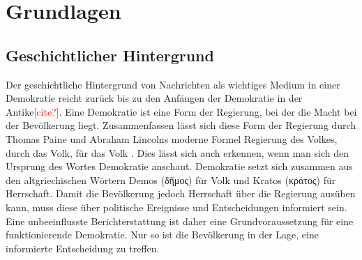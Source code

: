 \section{Grundlagen}

\subsection{Geschichtlicher Hintergrund}\label{sec:story-background}
Der geschichtliche Hintergrund von Nachrichten als wichtiges Medium in einer Demokratie reicht zurück bis zu den Anfängen der Demokratie in der Antike\textcolor{red}{[cite?]}.
Eine Demokratie ist eine Form der Regierung, bei der die Macht bei der Bevölkerung liegt.
Zusammenfassen lässt sich diese Form der Regierung durch Thomas Paine und Abraham Lincolns moderne Formel \glqq Regierung des Volkes, durch das Volk, für das Volk\grqq{} \cite{lincoln}.
Dies lässt sich auch erkennen, wenn man sich den Ursprung des Wortes Demokratie anschaut.
Demokratie setzt sich zusammen aus den altgriechischen Wörtern Demos (\textgreek{δῆμος}) für Volk und Kratos (\textgreek{κράτος}) für Herrschaft.
Damit die Bevölkerung jedoch Herrschaft über die Regierung ausüben kann, muss diese über politische Ereignisse und Entscheidungen informiert sein.
Eine unbeeinflusste Berichterstattung ist daher eine Grundvoraussetzung für eine funktionierende Demokratie.
Nur so ist die Bevölkerung in der Lage, eine informierte Entscheidung zu treffen. \\

